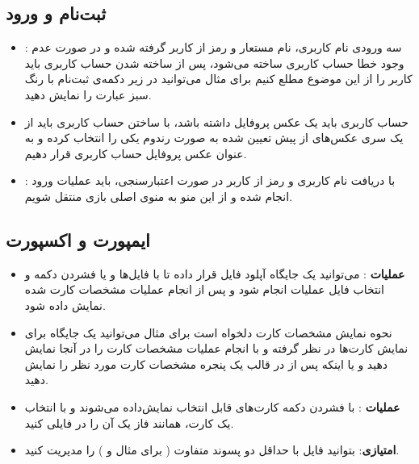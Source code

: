 \documentclass[]{article}
\begin{document}
\subsection*{{\titr ثبت‌نام و ورود}}
\begin{itemize}
    \item {}: سه ورودی نام کاربری، نام مستعار و رمز از کاربر گرفته شده و در صورت عدم وجود خطا حساب کاربری ساخته می‌شود، پس از ساخته شدن حساب کاربری باید کاربر را از این موضوع مطلع کنیم برای مثال می‌توانید در زیر دکمه‌ی ثبت‌نام با رنگ سبز عبارت  را نمایش دهید.
    \item حساب کاربری باید یک عکس پروفایل داشته باشد، با ساختن حساب کاربری باید از یک سری عکس‌های از پیش تعیین شده به صورت رندوم یکی را انتخاب کرده و به عنوان عکس پروفایل حساب کاربری قرار دهیم.
    \item {}: با دریافت نام کاربری و رمز از کاربر در صورت اعتبارسنجی، باید عملیات ورود انجام شده و از این منو به منوی اصلی بازی منتقل شویم.
\end{itemize}

\subsection*{{\titr ایمپورت و اکسپورت}}
\begin{itemize}
    \item \textbf{عملیات }: می‌توانید یک جایگاه آپلود فایل قرار داده تا با  فایل‌ها و یا فشردن دکمه و انتخاب فایل عملیات  انجام شود و پس از انجام عملیات مشخصات کارت  شده نمایش داده شود.
    \item نحوه نمایش مشخصات کارت دلخواه است برای مثال می‌توانید یک جایگاه برای نمایش کارت‌ها در نظر گرفته و با انجام عملیات  مشخصات کارت را در آنجا نمایش دهید و یا اینکه پس از  در قالب یک پنجره  مشخصات کارت مورد نظر را نمایش دهید.
    \item \textbf{عملیات }: با فشردن دکمه  کارت‌های قابل انتخاب نمایش‌داده می‌شوند و با انتخاب یک کارت، همانند فاز یک آن را در فایلی  کنید.
    \item \textbf{امتیازی}: بتوانید فایل با حداقل دو پسوند‌ متفاوت ( برای مثال  و  ) را مدیریت کنید.
\end{itemize}
\end{document}
